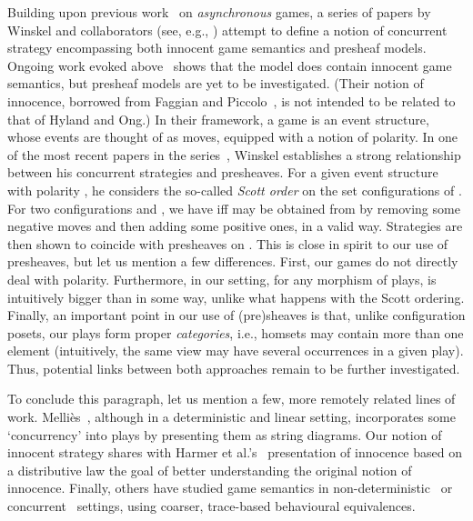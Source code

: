 \documentclass{LMCS}
\theoremstyle{plain}\newtheorem{satz}[thm]{Satz}
\begin{document}
Building upon previous
work~\cite{DBLP:conf/lics/AbramskyM99,Mellies04,DBLP:conf/concur/MelliesM07}
on \emph{asynchronous} games, a series of papers by Winskel and
collaborators (see, e.g., \citet{RideauW,DBLP:conf/fossacs/Winskel13})
attempt to define a notion of concurrent strategy encompassing both
innocent game semantics and presheaf models. Ongoing work evoked
above~\cite{CCWGalop14} shows that the model does contain innocent
game semantics, but presheaf models are yet to be investigated.
(Their notion of innocence, borrowed from Faggian and
Piccolo~\cite{DBLP:conf/tlca/FaggianP09}, is not intended to be
related to that of Hyland and Ong.)  In their framework, a game is an
event structure, whose events are thought of as moves, equipped with a
notion of polarity.  In one of the most recent papers in the
series~\cite{DBLP:conf/fossacs/Winskel13}, Winskel establishes a
strong relationship between his concurrent strategies and presheaves.
For a given event structure with polarity , he considers the
so-called \emph{Scott order} on the set  configurations of
.  For two configurations  and , we have 
iff  may be obtained from  by removing some negative moves and
then adding some positive ones, in a valid way.  Strategies are then
shown to coincide with presheaves on .  This
is close in spirit to our use of presheaves, but let us mention a few
differences. First, our games do not directly deal with
polarity. Furthermore, in our setting, for any morphism  of
plays,  is intuitively bigger than  in some way, unlike what
happens with the Scott ordering. Finally, an important point in our
use of (pre)sheaves is that, unlike configuration posets, our plays
form proper \emph{categories}, i.e., homsets may contain more than one
element (intuitively, the same view may have several occurrences in a
given play). Thus, potential links between both approaches remain to
be further investigated.

To conclude this paragraph, let us mention a few, more remotely related
lines of work.  Melli\`es~\cite{DBLP:conf/lics/Mellies12}, although in
a deterministic and linear setting, incorporates some `concurrency'
into plays by presenting them as string diagrams. Our notion of
innocent strategy shares with Harmer et
al.'s~\cite{DBLP:conf/lics/HarmerHM07} presentation of innocence based
on a distributive law the goal of better understanding the original
notion of innocence. Finally, others have studied game semantics in
non-deterministic~\cite{DBLP:conf/lics/HarmerM99} or
concurrent~\cite{DBLP:conf/fossacs/GhicaM04,DBLP:conf/fsttcs/Laird06}
settings, using coarser, trace-based behavioural equivalences.
\end{document}
